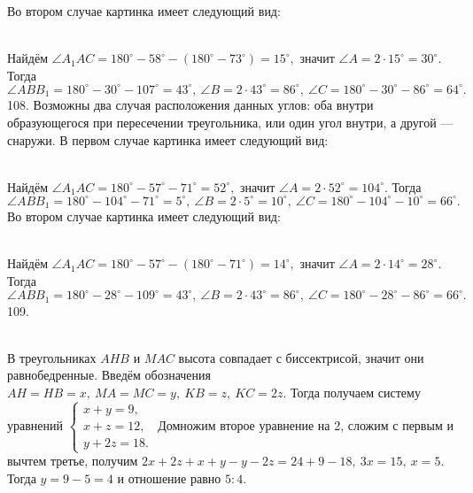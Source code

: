 Во втором случае картинка имеет следующий вид:
\begin{figure}[ht!]
\end{figure}\\
Найдём $\angle A_1AC=180^\circ-58^\circ-(180^\circ-73^\circ)=15^\circ,$ значит $\angle A=2\cdot15^\circ=30^\circ.$ Тогда $\angle ABB_1=180^\circ-30^\circ-107^\circ=43^\circ,\ \angle B=2\cdot43^\circ=86^\circ,\ \angle C=180^\circ-30^\circ-86^\circ=64^\circ.$\\
108. Возможны два случая расположения данных углов: оба внутри образующегося при пересечении треугольника, или один угол внутри, а другой --- снаружи. В первом случае картинка имеет следующий вид:
\begin{figure}[ht!]
\end{figure}\\
Найдём $\angle A_1AC=180^\circ-57^\circ-71^\circ=52^\circ,$ значит $\angle A=2\cdot52^\circ=104^\circ.$ Тогда $\angle ABB_1=180^\circ-104^\circ-71^\circ=5^\circ,\ \angle B=2\cdot5^\circ=10^\circ,\ \angle C=180^\circ-104^\circ-10^\circ=66^\circ.$\\
Во втором случае картинка имеет следующий вид:\\
\begin{figure}[ht!]
\end{figure}\\
Найдём $\angle A_1AC=180^\circ-57^\circ-(180^\circ-71^\circ)=14^\circ,$ значит $\angle A=2\cdot14^\circ=28^\circ.$ Тогда $\angle ABB_1=180^\circ-28^\circ-109^\circ=43^\circ,\ \angle B=2\cdot43^\circ=86^\circ,\ \angle C=180^\circ-28^\circ-86^\circ=66^\circ.$\\
109. \begin{figure}[ht!]
\end{figure}\\
В треугольниках $AHB$ и $MAC$ высота совпадает с биссектрисой, значит они равнобедренные. Введём обозначения $AH=HB=x,\ MA=MC=y,\ KB=z,\ KC=2z.$ Тогда получаем систему уравнений $\begin{cases} x+y=9,\\ x+z=12,\\ y+2z=18.\end{cases}$ Домножим второе уравнение на 2, сложим с первым и вычтем третье, получим $2x+2z+x+y-y-2z=24+9-18,\ 3x=15,\ x=5.$ Тогда $y=9-5=4$ и отношение равно $5:4.$\\
